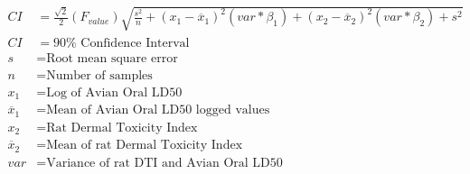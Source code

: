 \documentclass[fleqn, oneside, 11pt]{article}
\begin{document}
\begin{preview}
\begin{align*}
CI & = \frac{\sqrt{2}}{2}\left(F_{value}\right)\sqrt{\frac{s^{2}}{n}+\left(x_{1}-\overline{x}_{1}\right)^{2}\left(var*\beta_{1}\right)+\left(x_{2}-\overline{x}_{2}\right)^{2}\left(var*\beta_{2}\right)+s^{2}} \nonumber \\
CI & = 90\% \text{ Confidence Interval} \nonumber \\
s & =  \text{Root mean square error} \nonumber \\
n & =  \text{Number of samples} \nonumber \\
x_{1} & = \text{Log of Avian Oral LD50} \nonumber \\
\overline{x}_{1} & = \text{Mean of Avian Oral LD50 logged values} \nonumber \\
x_{2} & = \text{Rat Dermal Toxicity Index} \nonumber \\
\overline{x}_{2} & = \text{Mean of rat Dermal Toxicity Index} \nonumber \\
var & = \text{Variance of rat DTI and Avian Oral LD50} \nonumber \\
\end{align*} 
\end{preview}
\end{document}
